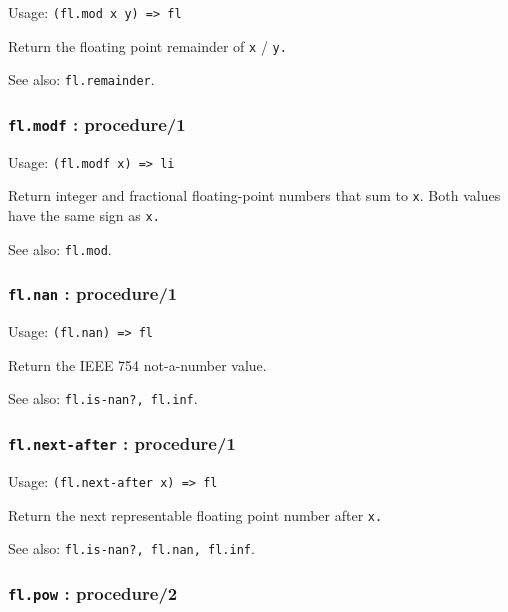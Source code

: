 \documentclass[
]{article}
\newcommand{\passthrough}[1]{#1}
\begin{document}
Usage: \passthrough{\lstinline!(fl.mod x y) => fl!}

Return the floating point remainder of \passthrough{\lstinline!x!} /
\passthrough{\lstinline!y.!}

See also: \passthrough{\lstinline!fl.remainder!}.

\hypertarget{fl.modf-procedure1}{%
\subsubsection{\texorpdfstring{\texttt{fl.modf} :
procedure/1}{fl.modf : procedure/1}}\label{fl.modf-procedure1}}

Usage: \passthrough{\lstinline!(fl.modf x) => li!}

Return integer and fractional floating-point numbers that sum to
\passthrough{\lstinline!x!}. Both values have the same sign as
\passthrough{\lstinline!x.!}

See also: \passthrough{\lstinline!fl.mod!}.

\hypertarget{fl.nan-procedure1}{%
\subsubsection{\texorpdfstring{\texttt{fl.nan} :
procedure/1}{fl.nan : procedure/1}}\label{fl.nan-procedure1}}

Usage: \passthrough{\lstinline!(fl.nan) => fl!}

Return the IEEE 754 not-a-number value.

See also: \passthrough{\lstinline!fl.is-nan?, fl.inf!}.

\hypertarget{fl.next-after-procedure1}{%
\subsubsection{\texorpdfstring{\texttt{fl.next-after} :
procedure/1}{fl.next-after : procedure/1}}\label{fl.next-after-procedure1}}

Usage: \passthrough{\lstinline!(fl.next-after x) => fl!}

Return the next representable floating point number after
\passthrough{\lstinline!x.!}

See also: \passthrough{\lstinline!fl.is-nan?, fl.nan, fl.inf!}.

\hypertarget{fl.pow-procedure2}{%
\subsubsection{\texorpdfstring{\texttt{fl.pow} :
procedure/2}{fl.pow : procedure/2}}\label{fl.pow-procedure2}}
\end{document}
